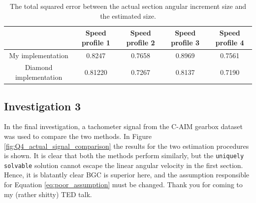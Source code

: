 \documentclass{article}
\begin{document}
	\begin{table}[]
		\centering
		\caption{The total squared error between the actual section angular increment size and the estimated size.}
		\label{tab:total_squared_error}
		\begin{tabular}{@{}ccccc@{}}
			\toprule
			& Speed profile 1 & Speed profile 2 & Speed profile 3 & Speed profile 4 \\ \midrule
			My implementation & 0.8247 & 0.7658 & 0.8969 & 0.7561 \\
			Diamond implementation & 0.81220 & 0.7267 & 0.8137 & 0.7190 \\ \bottomrule
		\end{tabular}
	\end{table}
	
	\subsection{Investigation 3}
	In the final investigation, a tachometer signal from the C-AIM gearbox dataset was used to compare the two methods. In Figure \ref{fig:Q4_actual_signal_comparison} the results for the two estimation procedures is shown. It is clear that both the methods perform similarly, but the \texttt{uniquely solvable} solution cannot escape the linear angular velocity in the first section. Hence, it is blatantly clear BGC is superior here, and the assumption responsible for Equation \eqref{eq:poor_assumption} must be changed. Thank you for coming to my (rather shitty) TED talk.
\end{document}
